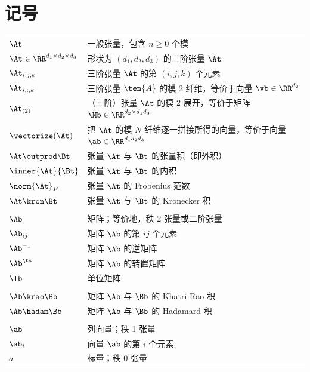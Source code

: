 \section*{记号}


    \begin{tabular}{ll}
        $\At$ & 一般张量，包含 $n \geq 0$ 个模 \\
        $\At\in \RR^{d_1 \times d_2 \times d_3}$ & 形状为 $(d_1, d_2, d_3)$ 的三阶张量 $\At$ \\
        $\At_{i,j,k}$ & 三阶张量 $\At$ 的第 $(i,j,k)$ 个元素 \\
        $\At_{i,:,k}$ & 三阶张量 $\ten{A}$ 的模 2 纤维，等价于向量 $\vb\in \RR^{d_2}$ \\
        $\At_{(2)}$ & （三阶）张量 $\At$ 的模 2 展开，等价于矩阵 $\Mb\in \RR^{d_2 \times d_1 d_3}$ \\
        $\vectorize(\At)$ & 把 $\At$ 的模 $N$ 纤维逐一拼接所得的向量，等价于向量 $\ab\in\RR^{d_1d_2d_3}$\\
        $\At\outprod \Bt$ & 张量 $\At$ 与 $\Bt$ 的张量积（即外积） \\
         $\inner{\At}{\Bt}$ & 张量 $\At$ 与 $\Bt$ 的内积\\
         $\norm{\At}_F$  &  张量 $\At$ 的 Frobenius 范数\\
         $\At\kron\Bt$ & 张量 $\At$ 与 $\Bt$ 的 Kronecker 积\\
         \\
         $\Ab$ & 矩阵；等价地，秩 2 张量或二阶张量\\
         $\Ab_{ij}$ & 矩阵 $\Ab$ 的第 $ij$ 个元素\\
         $\Ab^{-1}$ & 矩阵 $\Ab$ 的逆矩阵\\
         $\Ab^\ts$ & 矩阵 $\Ab$ 的转置矩阵\\
         $\Ib$ & 单位矩阵\\
         \\
         $\Ab\krao\Bb$ & 矩阵 $\Ab$ 与 $\Bb$ 的 Khatri-Rao 积\\
         $\Ab\hadam\Bb$ & 矩阵 $\Ab$ 与 $\Bb$ 的 Hadamard 积 \\ 
         \\
         $\ab$ & 列向量；秩 1 张量\\
         $\ab_{i}$ & 向量 $\ab$ 的第 $i$ 个元素 \\
         $a$ & 标量；秩 0 张量\\
         
         
\end{tabular}
 \newpage
